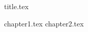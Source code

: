 \documentclass[a4paper,12pt]{report}
\begin{document}
    

{title.tex}



{chapter1.tex}
{chapter2.tex}
\end{document}
